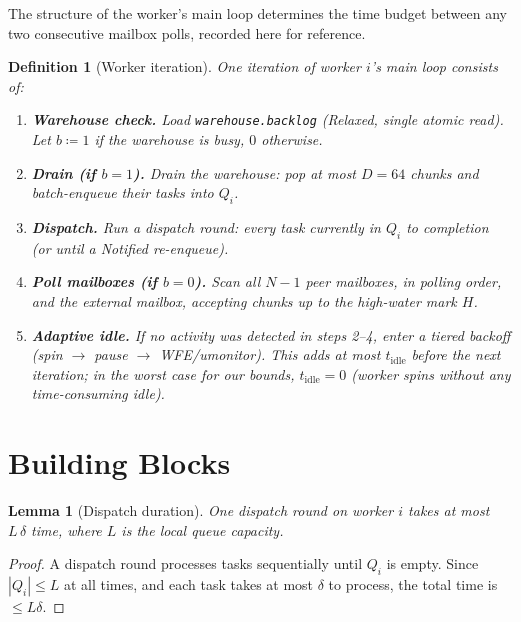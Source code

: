 \documentclass[11pt,a4paper]{report}
\newtheorem{lemma}[theorem]{Lemma}
\newtheorem{definition}{Definition}[section]
\newcommand{\code}[1]{\texttt{#1}}
\begin{document}
The structure of the worker's main loop determines the time budget
between any two consecutive mailbox polls, recorded here for
reference.

\begin{definition}[Worker iteration]
\label{def:iteration}
One \emph{iteration} of worker $i$'s main loop consists of:
\begin{enumerate}
  \item \textbf{Warehouse check.}  Load \code{warehouse.backlog}
        (Relaxed, single atomic read).  Let $b \coloneqq 1$ if the
        warehouse is busy, $0$ otherwise.
  \item \textbf{Drain (if $b=1$).}  Drain the warehouse: pop at most
        $D = 64$ chunks and batch-enqueue their tasks into $Q_i$.
  \item \textbf{Dispatch.}  Run a dispatch round: every task
        currently in $Q_i$ to completion (or until a Notified
        re-enqueue).
  \item \textbf{Poll mailboxes (if $b=0$).}  Scan all $N-1$ peer
        mailboxes, in polling order, and the external mailbox,
        accepting chunks up to the high-water mark $H$.
  \item \textbf{Adaptive idle.}  If no activity was detected in
        steps 2--4, enter a tiered backoff (spin $\to$ pause $\to$
        WFE/umonitor).  This adds at most $t_{\text{idle}}$ before
        the next iteration; in the worst case for our bounds,
        $t_{\text{idle}} = 0$ (worker spins without any
        time-consuming idle).
\end{enumerate}
\end{definition}

\section{Building Blocks}

\begin{lemma}[Dispatch duration]
\label{lem:dispatch}
One dispatch round on worker $i$ takes at most
$L\,\delta$ time, where $L$ is the local queue capacity.
\end{lemma}

\begin{proof}
A dispatch round processes tasks sequentially until $Q_i$ is
empty.  Since $|Q_i| \leq L$ at all times, and each task takes at
most $\delta$ to process, the total time is $\leq L\delta$.
\end{proof}
\end{document}
